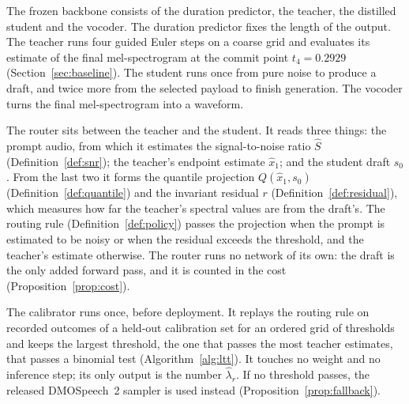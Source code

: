 The frozen backbone consists of the duration predictor, the teacher, the distilled student and the vocoder. The duration predictor fixes the length of the output. The teacher runs four guided Euler steps on a coarse grid and evaluates its estimate of the final mel-spectrogram at the commit point $t_4=0.2929$ (Section~\ref{sec:baseline}). The student runs once from pure noise to produce a draft, and twice more from the selected payload to finish generation. The vocoder turns the final mel-spectrogram into a waveform.

The router sits between the teacher and the student. It reads three things: the prompt audio, from which it estimates the signal-to-noise ratio $\hat S$ (Definition~\ref{def:snr}); the teacher's endpoint estimate $\hat x_1$; and the student draft $s_0$. From the last two it forms the quantile projection $Q(\hat x_1,s_0)$ (Definition~\ref{def:quantile}) and the invariant residual $r$ (Definition~\ref{def:residual}), which measures how far the teacher's spectral values are from the draft's. The routing rule (Definition~\ref{def:policy}) passes the projection when the prompt is estimated to be noisy or when the residual exceeds the threshold, and the teacher's estimate otherwise. The router runs no network of its own: the draft is the only added forward pass, and it is counted in the cost (Proposition~\ref{prop:cost}).

The calibrator runs once, before deployment. It replays the routing rule on recorded outcomes of a held-out calibration set for an ordered grid of thresholds and keeps the largest threshold, the one that passes the most teacher estimates, that passes a binomial test (Algorithm~\ref{alg:ltt}). It touches no weight and no inference step; its only output is the number $\hat\lambda_r$. If no threshold passes, the released DMOSpeech~2 sampler is used instead (Proposition~\ref{prop:fallback}).



